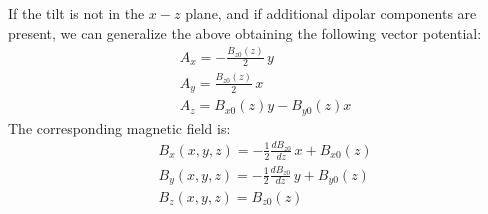 If the tilt is not in the $x-z$ plane, and if additional dipolar components are present,
we can generalize the above obtaining the following vector potential:
\begin{align}
&\boxed{A_x = -\frac{B_{z0}(z)}{2} \, y}\\
&\boxed{A_y = \frac{B_{z0}(z)}{2} \, x}\\
&\boxed{A_z = B_{x0}(z) y - B_{y0}(z) x}
\end{align}
The corresponding magnetic field is:
\begin{align}
&\boxed{B_x(x,y,z) = -\frac{1}{2} \frac{dB_{z0}}{dz} \, x  + B_{x0}(z)} \\
&\boxed{B_y(x,y,z) = -\frac{1}{2} \frac{dB_{z0}}{dz} \, y + B_{y0}(z)} \\
&\boxed{B_z(x,y,z) = B_{z0}(z)}
\end{align}
%
%
%
